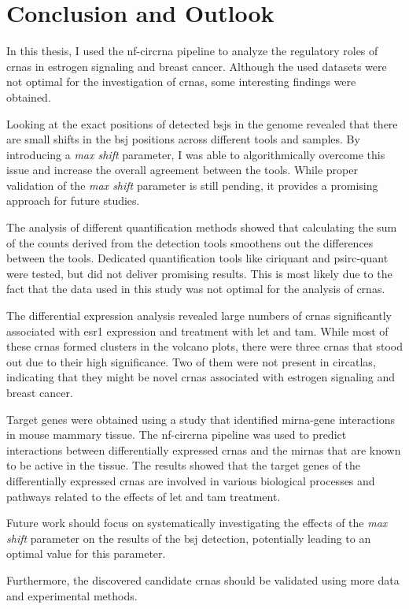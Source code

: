 \chapter{Conclusion and Outlook}
\label{sec:conclusion_and_outlook}

In this thesis, I used the \gls{nf-circrna} pipeline to analyze the regulatory
roles of \glspl{crna} in estrogen signaling and breast cancer.
Although the used datasets were not optimal for the investigation of
\glspl{crna}, some interesting findings were obtained.

Looking at the exact positions of detected \glspl{bsj} in the genome revealed
that there are small shifts in the \gls{bsj} positions across different tools
and samples.
By introducing a \textit{max shift} parameter, I was able to algorithmically
overcome this issue and increase the overall agreement between the tools.
While proper validation of the \textit{max shift} parameter is still pending,
it provides a promising approach for future studies.

The analysis of different quantification methods showed that calculating the
sum of the counts derived from the detection tools smoothens out the
differences between the tools.
Dedicated quantification tools like \gls{ciriquant} and \gls{psirc-quant} were
tested, but did not deliver promising results.
This is most likely due to the fact that the data used in this study was not
optimal for the analysis of \glspl{crna}.

The differential expression analysis revealed large numbers of \glspl{crna}
significantly associated with \gls{esr1} expression and treatment with
\gls{let} and \gls{tam}.
While most of these \glspl{crna} formed clusters in the volcano plots, there
were three \glspl{crna} that stood out due to their high significance.
Two of them were not present in \gls{circatlas}, indicating that they might be
novel \glspl{crna} associated with estrogen signaling and breast cancer.

Target genes were obtained using a study that identified \gls{mirna}-gene
interactions in mouse mammary tissue.
The \gls{nf-circrna} pipeline was used to predict interactions between
differentially expressed \glspl{crna} and the \glspl{mirna} that are known to
be active in the tissue.
The results showed that the target genes of the differentially expressed
\glspl{crna} are involved in various biological processes and pathways related
to the effects of \gls{let} and \gls{tam} treatment.

Future work should focus on systematically investigating the effects of the
\textit{max shift} parameter on the results of the \gls{bsj} detection,
potentially leading to an optimal value for this parameter.

Furthermore, the discovered candidate \glspl{crna} should be validated using
more data and experimental methods.
